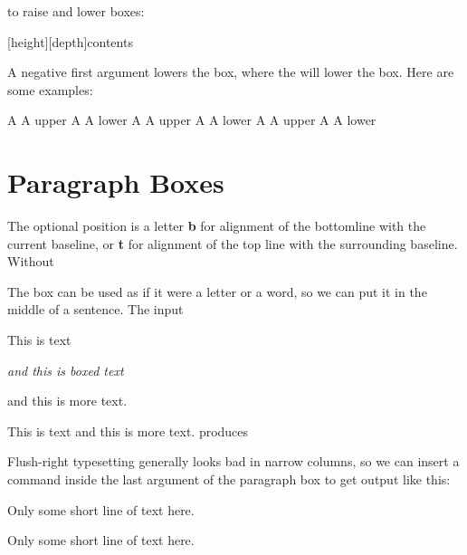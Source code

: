 {\CMDI{\raisebox} to raise and lower boxes:

\begin{teX}
\raisebox{raiselength}[height][depth]{contents}
\end{teX}

A negative first argument lowers the box, where the \cmd{\lowerbox} will lower the box. Here are some examples:


A  A
upper
A  A
lower
A  A
upper
A  A
lower
A  A
upper
A  A
lower

\section{Paragraph Boxes}



The optional position
is a letter \textbf{b} for alignment of the bottomline with the current baseline,
or \textbf{t} for alignment of the top line with the surrounding baseline. Without

The box can be used as if it were a letter or a word, so we can put it in
the middle of a sentence. The input

This is text \parbox{30pt}{\it and this is boxed text} and
this is more text.

This is text 
and this is more text.
produces


Flush-right typesetting generally looks bad in narrow columns, so we
can insert a \cs{raggedright} command inside the last argument of the paragraph
box to get output like this:

\begin{texexample}{}{}

\parbox[b][120pt][t]{100pt}{\lorem}%
\hspace{1cm}%
\parbox[b][120pt][t]{100pt}{Only some short line of text here.}%



\parbox[b][100pt][t]{100pt}{\lorem}\hspace{1cm}\parbox[b][100pt][c]{100pt}{Only some short line of text here.}


\end{texexample}}
